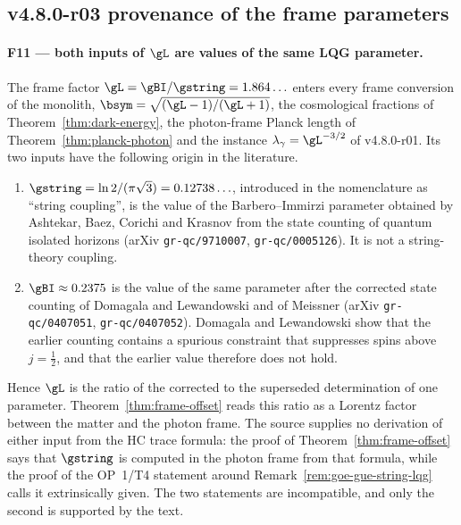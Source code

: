 \subsection*{v4.8.0-r03 provenance of the frame parameters}
\label{subsec:v480-r03-frame-parameter-provenance}

\paragraph{F11 --- both inputs of \(\gL\) are values of the same LQG parameter.}
The frame factor \(\gL=\gBI/\gstring=1.864\ldots\) enters every frame conversion of the monolith,
\(\bsym=\sqrt{(\gL-1)/(\gL+1)}\), the cosmological fractions of
Theorem~\ref{thm:dark-energy}, the photon-frame Planck length of
Theorem~\ref{thm:planck-photon} and the instance \(\lambda_\gamma=\gL^{-3/2}\) of
v4.8.0-r01.  Its two inputs have the following origin in the literature.
\begin{enumerate}[leftmargin=2em]
 \item \(\gstring=\ln2/(\pi\sqrt3)=0.12738\ldots\), introduced in the nomenclature as
 ``string coupling'', is the value of the Barbero--Immirzi parameter obtained by Ashtekar, Baez,
 Corichi and Krasnov from the state counting of quantum isolated horizons
 (arXiv \texttt{gr-qc/9710007}, \texttt{gr-qc/0005126}).  It is not a string-theory coupling.
 \item \(\gBI\approx0.2375\) is the value of the same parameter after the corrected state
 counting of Domagala and Lewandowski and of Meissner (arXiv \texttt{gr-qc/0407051},
 \texttt{gr-qc/0407052}).  Domagala and Lewandowski show that the earlier counting contains a
 spurious constraint that suppresses spins above \(j=\tfrac12\), and that the earlier value
 therefore does not hold.
\end{enumerate}
Hence \(\gL\) is the ratio of the corrected to the superseded determination of one parameter.
Theorem~\ref{thm:frame-offset} reads this ratio as a Lorentz factor between the matter and the
photon frame.  The source supplies no derivation of either input from the HC trace formula: the
proof of Theorem~\ref{thm:frame-offset} says that \(\gstring\) is computed in the photon frame
from that formula, while the proof of the OP~1/T4 statement around
Remark~\ref{rem:goe-gue-string-lqg} calls it extrinsically given.  The two statements are
incompatible, and only the second is supported by the text.


